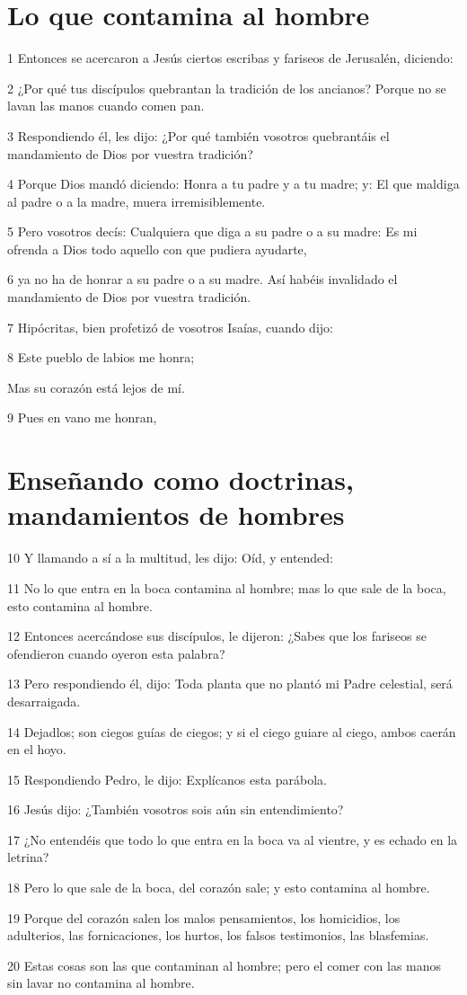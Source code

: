 \section*{Lo que contamina al hombre}

\par 1 Entonces se acercaron a Jesús ciertos escribas y fariseos de Jerusalén, diciendo:
\par 2 ¿Por qué tus discípulos quebrantan la tradición de los ancianos? Porque no se lavan las manos cuando comen pan.
\par 3 Respondiendo él, les dijo: ¿Por qué también vosotros quebrantáis el mandamiento de Dios por vuestra tradición?
\par 4 Porque Dios mandó diciendo: Honra a tu padre y a tu madre; y: El que maldiga al padre o a la madre, muera irremisiblemente.
\par 5 Pero vosotros decís: Cualquiera que diga a su padre o a su madre: Es mi ofrenda a Dios todo aquello con que pudiera ayudarte,
\par 6 ya no ha de honrar a su padre o a su madre. Así habéis invalidado el mandamiento de Dios por vuestra tradición.
\par 7 Hipócritas, bien profetizó de vosotros Isaías, cuando dijo:
\par 8 Este pueblo de labios me honra;
\par Mas su corazón está lejos de mí.
\par 9 Pues en vano me honran,

\section*{Enseñando como doctrinas, mandamientos de hombres}

\par 10 Y llamando a sí a la multitud, les dijo: Oíd, y entended:
\par 11 No lo que entra en la boca contamina al hombre; mas lo que sale de la boca, esto contamina al hombre.
\par 12 Entonces acercándose sus discípulos, le dijeron: ¿Sabes que los fariseos se ofendieron cuando oyeron esta palabra?
\par 13 Pero respondiendo él, dijo: Toda planta que no plantó mi Padre celestial, será desarraigada.
\par 14 Dejadlos; son ciegos guías de ciegos; y si el ciego guiare al ciego, ambos caerán en el hoyo.
\par 15 Respondiendo Pedro, le dijo: Explícanos esta parábola.
\par 16 Jesús dijo: ¿También vosotros sois aún sin entendimiento?
\par 17 ¿No entendéis que todo lo que entra en la boca va al vientre, y es echado en la letrina?
\par 18 Pero lo que sale de la boca, del corazón sale; y esto contamina al hombre.
\par 19 Porque del corazón salen los malos pensamientos, los homicidios, los adulterios, las fornicaciones, los hurtos, los falsos testimonios, las blasfemias.
\par 20 Estas cosas son las que contaminan al hombre; pero el comer con las manos sin lavar no contamina al hombre.

